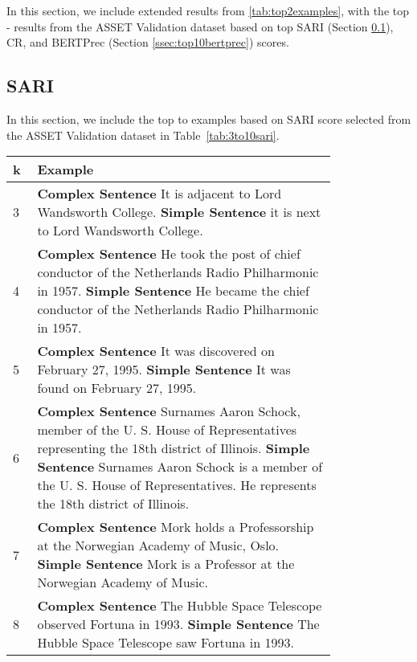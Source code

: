 \documentclass[11pt]{article}
\begin{document}
In this section, we include extended results from \ref{tab:top2examples}, with the top - results from the ASSET Validation dataset based on top SARI (Section \ref{ssec:top10sari}), CR, and BERTPrec (Section \ref{ssec:top10bertprec}) scores.

\subsection{SARI}
\label{ssec:top10sari}

In this section, we include the top  to  examples based on SARI score selected from the ASSET Validation dataset in Table~\ref{tab:3to10sari}.

\begin{table*}[htbp]
\centering
\small
\renewcommand{\arraystretch}{1.5}
\begin{tabular}{p{0.05\linewidth} p{0.75\linewidth}} \toprule
k & Example \\ \midrule
3 & \textbf{Complex Sentence} It is adjacent to Lord Wandsworth College. \newline \textbf{Simple Sentence} it is next to Lord Wandsworth College.\\
\midrule
4 & \textbf{Complex Sentence} He took the post of chief conductor of the Netherlands Radio Philharmonic in 1957. \newline \textbf{Simple Sentence} He became the chief conductor of the Netherlands Radio Philharmonic in 1957.\\
\midrule
5 & \textbf{Complex Sentence} It was discovered on February 27, 1995. \newline \textbf{Simple Sentence} It was found on February 27, 1995.\\
\midrule
6 & \textbf{Complex Sentence} Surnames Aaron Schock, member of the U. S. House of Representatives representing the 18th district of Illinois. \newline \textbf{Simple Sentence} Surnames Aaron Schock is a member of the U. S. House of Representatives. He represents the 18th district of Illinois.\\
\midrule
7 & \textbf{Complex Sentence} Mork holds a Professorship at the Norwegian Academy of Music, Oslo. \newline \textbf{Simple Sentence} Mork is a Professor at the Norwegian Academy of Music.\\
\midrule
    8   & \textbf{Complex Sentence} The Hubble Space Telescope observed Fortuna in 1993.  \newline                                   \textbf{Simple Sentence}  The Hubble Space Telescope saw Fortuna in 1993.\\
    \midrule


\end{tabular}
\end{table*}
\end{document}
